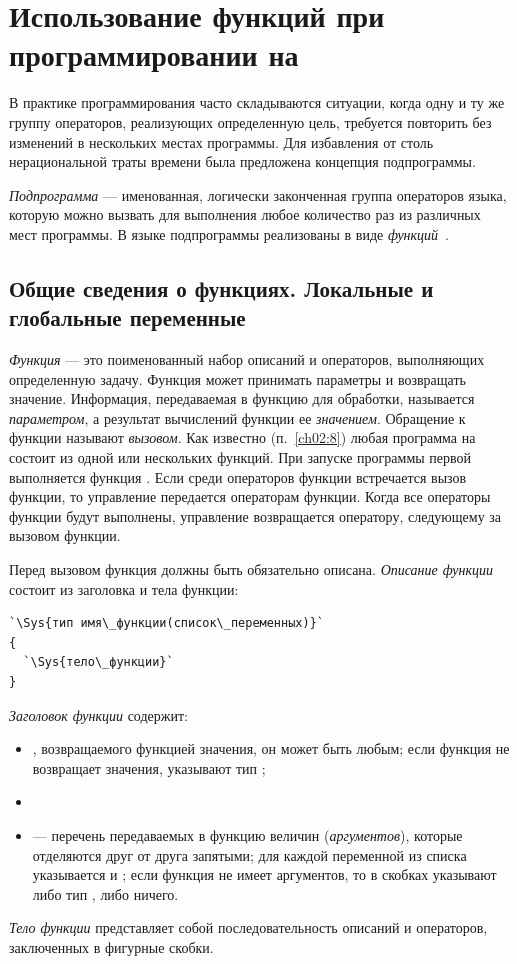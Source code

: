 \chapter[Использование функций при программировании на \Sys{C++}]{Использование функций при программировании на }\label{ch04}
В практике программирования часто складываются ситуации, когда одну и ту же группу операторов, реализующих определенную
цель, требуется повторить без изменений в нескольких местах программы. Для избавления от столь нерациональной траты
времени была предложена концепция подпрограммы.

\emph{Подпрограмма} --- именованная, логически законченная группа операторов языка,
которую можно вызвать для выполнения любое количество раз из различных мест программы. В языке  подпрограммы
реализованы в виде \emph{функций}~\cite{KR}.

\section[Общие сведения о функциях]{Общие сведения о функциях. Локальные и
глобальные переменные}
\emph{Функция} --- это поименованный набор описаний и операторов, выполняющих определенную
задачу. Функция может принимать параметры и возвращать значение. Информация, передаваемая в функцию для обработки,
называется \emph{параметром}, а результат вычислений функции ее \emph{значением}. Обращение к
функции называют \emph{вызовом}. Как известно (п.~\ref{ch02:8}) любая программа на  состоит из одной или
нескольких функций. При запуске программы первой выполняется функция . Если среди операторов
функции  встречается вызов функции, то управление передается операторам функции. Когда все
операторы функции будут выполнены, управление возвращается оператору, следующему за вызовом функции.

Перед вызовом функция должны быть обязательно описана. \emph{Описание функции}
состоит из заголовка и тела функции:
\begin{lstlisting}
`\Sys{тип имя\_функции(список\_переменных)}`
{
  `\Sys{тело\_функции}`
}
\end{lstlisting}
\emph{Заголовок функции} содержит:

\begin{itemize}
\item {}, возвращаемого функцией значения, он может быть любым; если функция не возвращает значения,
указывают тип ;
\item {}
\item {} --- перечень передаваемых в функцию величин (\emph{аргументов}),
которые отделяются друг от друга запятыми; для каждой переменной из списка указывается  и
; если функция не имеет аргументов, то в скобках указывают либо тип , либо
ничего.
\end{itemize}
\emph{Тело функции} представляет собой последовательность описаний и
операторов, заключенных в фигурные скобки.

